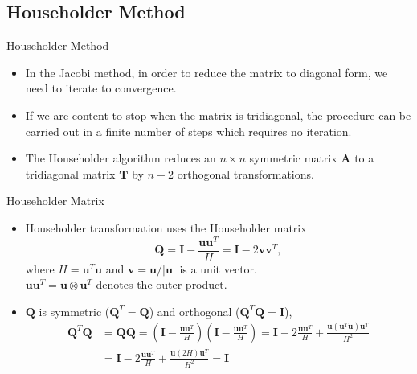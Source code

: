 \documentclass{beamer}
\begin{document}
\subsection[Householder Method]{Householder Method}
\begin{frame}{Householder Method}
    \begin{itemize}
        \item In the Jacobi method, in order to reduce the matrix to diagonal form, we need to iterate to convergence. 
        \item If we are content to stop when the matrix is tridiagonal,  the procedure can be carried out in a finite number
        of steps which requires no iteration.
        \item The Householder algorithm reduces an $n\times n$ symmetric matrix $\mathbf{A}$ to a tridiagonal matrix $\mathbf{T}$ by $n-2$ orthogonal transformations.
    \end{itemize}
\end{frame}
\begin{frame}{Householder Matrix}
    \begin{itemize}
        \item  Householder transformation uses the Householder matrix
        \[
            \mathbf{Q}=\mathbf{I}-\frac{\mathbf{u} \mathbf{u}^T}{H}= \mathbf{I}-2 {\mathbf{v} \mathbf{v}^T},
        \] 
        where  $H=\mathbf{u}^T \mathbf{u}$ and $\mathbf{v}=\mathbf{u}/|\mathbf{u}|$ is a unit vector. \\
        $\mathbf{u} \mathbf{u}^T= \mathbf{u}\otimes \mathbf{u}^T$  denotes the outer product. 
        \item $\mathbf{Q}$ is symmetric ($\mathbf{Q}^T=\mathbf{Q}$) and orthogonal ($\mathbf{Q}^T \mathbf{Q}=\mathbf{I}$),
        \begin{align*}
            \mathbf{Q}^T \mathbf{Q} & =\mathbf{Q} \mathbf{Q}=\left(\mathbf{I}-\frac{\mathbf{u} \mathbf{u}^T}{H}\right)\left(\mathbf{I}-\frac{\mathbf{u} \mathbf{u}^T}{H}\right)=\mathbf{I}-2 \frac{\mathbf{u} \mathbf{u}^T}{H}+\frac{\mathbf{u}\left(\mathbf{u}^T \mathbf{u}\right) \mathbf{u}^T}{H^2} \\
            & =\mathbf{I}-2 \frac{\mathbf{u u}^T}{H}+\frac{\mathbf{u}(2 H) \mathbf{u}^T}{H^2}=\mathbf{I}
        \end{align*}
    \end{itemize}
\end{frame}
\end{document}
